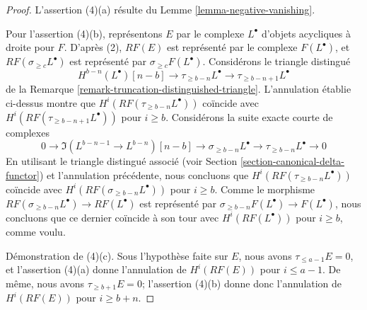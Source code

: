 \begin{proof}
\medskip\noindent
L'assertion (4)(a) résulte du Lemme \ref{lemma-negative-vanishing}.

\medskip\noindent
Pour l'assertion (4)(b), représentons $E$ par le complexe $L^\bullet$
d'objets acycliques à droite pour $F$. D'après (2), $RF(E)$ est représenté
par le complexe $F(L^\bullet)$, et $RF(\sigma_{\geq c}L^\bullet)$ est
représenté par $\sigma_{\geq c}F(L^\bullet)$. Considérons le triangle
distingué
$$
H^{b - n}(L^\bullet)[n - b] \to
\tau_{\geq b - n}L^\bullet \to
\tau_{\geq b - n + 1}L^\bullet
$$
de la Remarque \ref{remark-truncation-distinguished-triangle}.
L'annulation établie ci-dessus montre que
$H^i(RF(\tau_{\geq b - n}L^\bullet))$ coïncide avec
$H^i(RF(\tau_{\geq b - n + 1}L^\bullet))$ pour $i \geq b$.
Considérons la suite exacte courte de complexes
$$
0 \to
\Im(L^{b - n - 1} \to L^{b - n})[n - b] \to
\sigma_{\geq b - n}L^\bullet \to
\tau_{\geq b - n}L^\bullet \to 0
$$
En utilisant le triangle distingué associé (voir
Section \ref{section-canonical-delta-functor}) et l'annulation précédente,
nous concluons que $H^i(RF(\tau_{\geq b - n}L^\bullet))$ coïncide avec
$H^i(RF(\sigma_{\geq b - n}L^\bullet))$ pour $i \geq b$.
Comme le morphisme
$RF(\sigma_{\geq b - n}L^\bullet) \to RF(L^\bullet)$ est représenté par
$\sigma_{\geq b - n}F(L^\bullet) \to F(L^\bullet)$, nous concluons que ce
dernier coïncide à son tour avec $H^i(RF(L^\bullet))$ pour $i \geq b$, comme
voulu.

\medskip\noindent
Démonstration de (4)(c). Sous l'hypothèse faite sur $E$, nous avons
$\tau_{\leq a - 1}E = 0$, et l'assertion (4)(a) donne l'annulation de
$H^i(RF(E))$ pour $i \leq a - 1$. De même, nous avons
$\tau_{\geq b + 1}E = 0$; l'assertion (4)(b) donne donc l'annulation de
$H^i(RF(E))$ pour $i \geq b + n$.
\end{proof}

